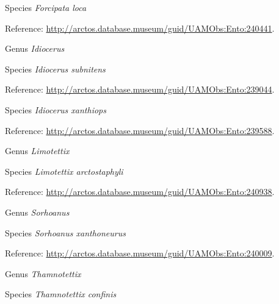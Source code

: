 \documentclass[9pt, article]{memoir}
\begin{document}
\begin{multicols}{2}
\vspace{6pt}\noindent\hspace{36pt}Species \textit{Forcipata loca}


\vspace{6pt}Reference: 
\url{http://arctos.database.museum/guid/UAMObs:Ento:240441}.

\vspace{6pt}\noindent\hspace{30pt}Genus \textit{Idiocerus}


\vspace{6pt}\noindent\hspace{36pt}Species \textit{Idiocerus subnitens}


\vspace{6pt}Reference: 
\url{http://arctos.database.museum/guid/UAMObs:Ento:239044}.

\vspace{6pt}\noindent\hspace{36pt}Species \textit{Idiocerus xanthiops}


\vspace{6pt}Reference: 
\url{http://arctos.database.museum/guid/UAMObs:Ento:239588}.

\vspace{6pt}\noindent\hspace{30pt}Genus \textit{Limotettix}


\vspace{6pt}\noindent\hspace{36pt}Species \textit{Limotettix arctostaphyli}


\vspace{6pt}Reference: 
\url{http://arctos.database.museum/guid/UAMObs:Ento:240938}.

\vspace{6pt}\noindent\hspace{30pt}Genus \textit{Sorhoanus}


\vspace{6pt}\noindent\hspace{36pt}Species \textit{Sorhoanus xanthoneurus}


\vspace{6pt}Reference: 
\url{http://arctos.database.museum/guid/UAMObs:Ento:240009}.

\vspace{6pt}\noindent\hspace{30pt}Genus \textit{Thamnotettix}


\vspace{6pt}\noindent\hspace{36pt}Species \textit{Thamnotettix confinis}



\end{multicols}
\end{document}
